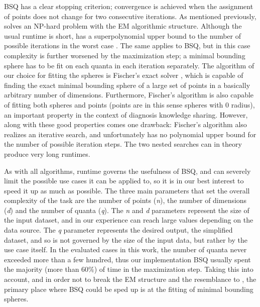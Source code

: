 			\ac{BSQ} has a clear stopping criterion; convergence is achieved when the assignment of points does not change for two consecutive iterations.
			As mentioned previously, \kmeans{} solves an NP-hard problem with the EM algorithmic structure.
			Although the usual runtime is short, \kmeans{} has a superpolynomial upper bound to the number of possible iterations in the worst case \cite{kmeansslow}.
			The same applies to \ac{BSQ}, but in this case complexity is further worsened by the maximization step; a minimal bounding sphere has to be fit on each quanta in each iteration separately.
			The algorithm of our choice for fitting the spheres is Fischer's exact solver \cite{fischer}, which is capable of finding the exact minimal bounding sphere of a large set of points in a basically arbitrary number of dimensions.
			Furthermore, Fischer's algorithm is also capable of fitting both spheres and points \cite{balls_of_balls} (points are in this sense spheres with $0$ radius), an important property in the context of diagnosis knowledge sharing.
			However, along with these good properties comes one drawback: Fischer's algorithm also realizes an iterative search, and unfortunately has no polynomial upper bound for the number of possible iteration steps. The two nested searches can in theory produce very long runtimes.
			
			As with all algorithms, runtime governs the usefulness of \ac{BSQ}, and can severely limit the possible use cases it can be applied to, so it is in our best interest to speed it up as much as possible.
			The three main parameters that set the overall complexity of the task are the number of points (\textit{n}), the number of dimensions (\textit{d}) and the number of quanta (\textit{q}).
			The \textit{n} and \textit{d} parameters represent the size of the input dataset, and in our experience can reach large values depending on the data source.
			The \textit{q} parameter represents the desired output, the simplified dataset, and so is not governed by the size of the input data, but rather by the use case itself.
			In the evaluated cases in this work, the number of quanta never exceeded more than a few hundred, thus our implementation \ac{BSQ} usually spent the majority (more than $60\%$) of time in the maximization step.
			Taking this into account, and in order not to break the \ac{EM} structure and the resemblance to \kmeans{}, the primary place where \ac{BSQ} could be sped up is at the fitting of minimal bounding spheres.
			
